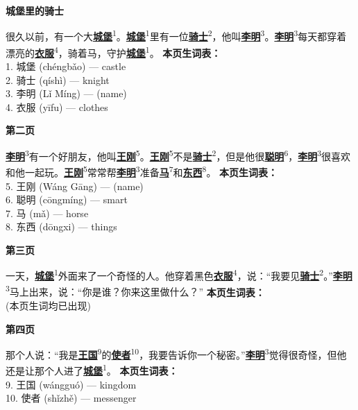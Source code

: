 \documentclass[20pt]{extarticle}
\newcommand{\glossedword}[2]{\uline{\textbf{#1}}\textsuperscript{#2}}
\begin{document}
\begin{center}
    {\fontsize{36}{44}\selectfont \textbf{城堡里的骑士}}
\end{center}
\vspace{2em}
{\fontsize{22}{30}\selectfont
\noindent
很久以前，有一个大\glossedword{城堡}{1}。\glossedword{城堡}{1}里有一位\glossedword{骑士}{2}，他叫\glossedword{李明}{3}。\glossedword{李明}{3}每天都穿着漂亮的\glossedword{衣服}{4}，骑着马，守护\glossedword{城堡}{1}。
}
\vfill
{\fontsize{18}{26}\selectfont
\noindent
\textbf{本页生词表：}\\[0.5em]
1. 城堡 (chéngbǎo) — castle\\
2. 骑士 (qíshì) — knight\\
3. 李明 (Lǐ Míng) — (name)\\
4. 衣服 (yīfu) — clothes
}
\newpage

\begin{center}
    {\fontsize{36}{44}\selectfont \textbf{第二页}}
\end{center}
\vspace{2em}
{\fontsize{22}{30}\selectfont
\noindent
\glossedword{李明}{3}有一个好朋友，他叫\glossedword{王刚}{5}。\glossedword{王刚}{5}不是\glossedword{骑士}{2}，但是他很\glossedword{聪明}{6}，\glossedword{李明}{3}很喜欢和他一起玩。\glossedword{王刚}{5}常常帮\glossedword{李明}{3}准备\glossedword{马}{7}和\glossedword{东西}{8}。
}
\vfill
{\fontsize{18}{26}\selectfont
\noindent
\textbf{本页生词表：}\\[0.5em]
5. 王刚 (Wáng Gāng) — (name)\\
6. 聪明 (cōngmíng) — smart\\
7. 马 (mǎ) — horse\\
8. 东西 (dōngxi) — things
}
\newpage

\begin{center}
    {\fontsize{36}{44}\selectfont \textbf{第三页}}
\end{center}
\vspace{2em}
{\fontsize{22}{30}\selectfont
\noindent
一天，\glossedword{城堡}{1}外面来了一个奇怪的人。他穿着黑色\glossedword{衣服}{4}，说：“我要见\glossedword{骑士}{2}。”\glossedword{李明}{3}马上出来，说：“你是谁？你来这里做什么？”
}
\vfill
{\fontsize{18}{26}\selectfont
\noindent
\textbf{本页生词表：}\\[0.5em]
(本页生词均已出现)
}
\newpage

\begin{center}
    {\fontsize{36}{44}\selectfont \textbf{第四页}}
\end{center}
\vspace{2em}
{\fontsize{22}{30}\selectfont
\noindent
那个人说：“我是\glossedword{王国}{9}的\glossedword{使者}{10}，我要告诉你一个秘密。”\glossedword{李明}{3}觉得很奇怪，但他还是让那个人进了\glossedword{城堡}{1}。
}
\vfill
{\fontsize{18}{26}\selectfont
\noindent
\textbf{本页生词表：}\\[0.5em]
9. 王国 (wángguó) — kingdom\\
10. 使者 (shǐzhě) — messenger
}
\newpage
\end{document}

